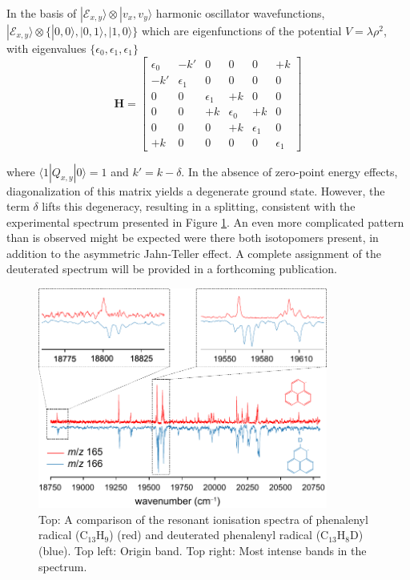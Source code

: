 \documentclass[journal=jacsat,manuscript=article,layout=onecolumn]{achemso}
\begin{document}
In the basis of $|\mathcal{E}_{x,y}\rangle\otimes|v_x,v_y\rangle$ harmonic oscillator wavefunctions, $|\mathcal{E}_{x,y}\rangle\otimes\{|0,0\rangle, |0,1\rangle, |1,0\rangle\}$ which are eigenfunctions of the potential $V = \lambda \rho^2$, with eigenvalues $\{\epsilon_0,\epsilon_1,\epsilon_1\}$
\begin{equation}\label{JT2}
  \mathbf{H} = \left[\begin{array}{cccccc}
                      \epsilon_0 & -k' & 0 & 0 & 0 & +k\\
                      -k' & \epsilon_1 & 0 & 0 & 0 & 0 \\
                      0 & 0 & \epsilon_1 & +k & 0 & 0 \\
                      0 & 0 & +k & \epsilon_0 & +k & 0\\
                      0 & 0 & 0 & +k & \epsilon_1 & 0\\
                      +k & 0 & 0 & 0 & 0 & \epsilon_1 
                     \end{array}
    \right]
\end{equation}

where $\langle1|Q_{x,y}|0\rangle=1$ and $k'=k-\delta$. In the absence of zero-point energy effects, diagonalization of this matrix yields a degenerate ground state. However, the term $\delta$ lifts this degeneracy, resulting in a splitting, consistent with the experimental spectrum presented in Figure \ref{fig3}. An even more complicated pattern than is observed might be expected were there both isotopomers present, in addition to the asymmetric Jahn-Teller effect. A complete assignment of the deuterated spectrum will be provided in a forthcoming publication.

\begin{figure}[h!]
	\includegraphics[width=0.85\textwidth]{Figures/Figure3}
	\caption{Top: A comparison of the resonant ionisation spectra of phenalenyl radical (C$_{13}$H$_9$) (red) and deuterated phenalenyl radical (C$_{13}$H$_8$D) (blue). Top left: Origin band. Top right: Most intense bands in the spectrum.}
	\label{fig3}
\end{figure}
\end{document}
